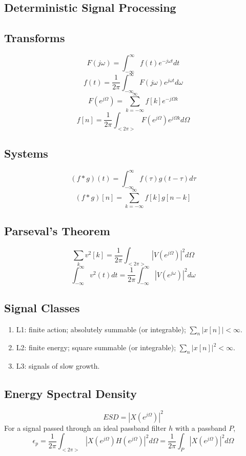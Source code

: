 \documentclass[8pt]{extarticle}
\begin{document}
\fontsize{5}{6}
\selectfont

\begin{multicols*}{3}
\setlength{\columnseprule}{0.5pt}

\begin{center}

\section{Deterministic Signal Processing}
\subsection{Transforms}
\[ F(j\omega) = \int_{-\infty}^{\infty} f(t) e^{-j\omega t} dt \]
\[ f(t) = \frac{1}{2\pi} \int_{-\infty}^{\infty} F(j\omega) e^{j\omega t} d\omega \]
\[ F(e^{j\Omega}) = \sum_{k = -\infty}^{\infty} f[k] e^{-j\Omega k} \]
\[ f[n] = \frac{1}{2\pi} \int_{<2\pi>} F(e^{j\Omega}) e^{j\Omega k} d\Omega \]

\subsection{Systems}
\[ (f * g)(t) = \int_{-\infty}^{\infty} f(\tau)g(t-\tau) d\tau \]
\[ (f * g)[n] = \sum_{k=-\infty}^{\infty} f[k]g[n-k] \]

\subsection{Parseval's Theorem}
\[ \sum_{k} v^2[k] = \frac{1}{2\pi}\int_{<2\pi>} |V(e^{j\Omega})|^2 d\Omega \]
\[ \int_{-\infty}^{\infty} v^2(t) dt = \frac{1}{2\pi}\int_{-\infty}^{\infty} |V(e^{j\omega})|^2 d\omega \]

\subsection{Signal Classes}
\begin{enumerate}
\item L1: finite action; absolutely summable (or integrable); \( \sum_{n} |x[n]| < \infty \).
\item L2: finite energy; square summable (or integrable); \( \sum_{n} |x[n]|^2 < \infty \).
\item L3: signals of slow growth.
\end{enumerate}

\subsection{Energy Spectral Density}
\[ ESD = |X(e^{j\Omega})|^2 \]
For a signal passed through an ideal passband filter \( h \) with a passband \( P \),
\[ \epsilon_{p} = \frac{1}{2\pi} \int_{<2\pi>} |X(e^{j\Omega})H(e^{j\Omega})|^2 d\Omega = \frac{1}{2\pi} \int_{P} |X(e^{j\Omega})|^2 d\Omega \]


\end{center}
\end{multicols*}
\end{document}
